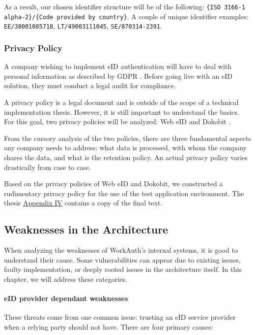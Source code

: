 As a result, our chosen identifier structure will be of the following: \texttt{\{ISO 3166-1 alpha-2\}/\{Code provided by country\}}. A couple of unique identifier examples: \texttt{EE/38001085718}, \texttt{LT/49003111045}, \texttt{SE/870314-2391}.

\subsubsection{Privacy Policy}

A company wishing to implement eID authentication will have to deal with personal information as described by GDPR \cite{eulaw-gdpr}. Before going live with an eID solution, they must conduct a legal audit for compliance.

A privacy policy is a legal document and is outside of the scope of a technical implementation thesis. However, it is still important to understand the basics. For this goal, two privacy policies will be analyzed: Web eID \cite{legal-webeid-privacypolicy} and Dokobit \cite{legal-dokobit-privacypolicy}.

From the cursory analysis of the two policies, there are three fundamental aspects any company needs to address: what data is processed, with whom the company shares the data, and what is the retention policy. An actual privacy policy varies drastically from case to case.

Based on the privacy policies of Web eID and Dokobit, we constructed a rudimentary privacy policy for the use of the test application environment. The thesis \hyperref[appendix:privacy]{Appendix IV} contains a copy of the final text.

\subsection{Weaknesses in the Architecture}

When analyzing the weaknesses of WorkAuth's internal systems, it is good to understand their cause. Some vulnerabilities can appear due to existing issues, faulty implementation, or deeply rooted issues in the architecture itself. In this chapter, we will address these categories.

\paragraph{eID provider dependant weaknesses}

These threats come from one common issue: trusting an eID service provider when a relying party should not have. There are four primary causes:

